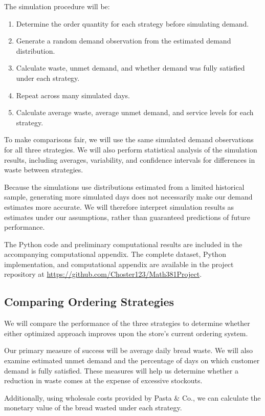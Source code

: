 \documentclass[11pt]{article}
\begin{document}
The simulation procedure will be:
\begin{enumerate}
\item Determine the order quantity for each strategy before simulating demand.
\item Generate a random demand observation from the estimated demand distribution.
\item Calculate waste, unmet demand, and whether demand was fully satisfied under each strategy.
\item Repeat across many simulated days.
\item Calculate average waste, average unmet demand, and service levels for each strategy.
\end{enumerate}

To make comparisons fair, we will use the same simulated demand observations for all three strategies. We will also perform statistical analysis of the simulation results, including averages, variability, and confidence intervals for differences in waste between strategies.

Because the simulations use distributions estimated from a limited historical sample, generating more simulated days does not necessarily make our demand estimates more accurate. We will therefore interpret simulation results as estimates under our assumptions, rather than guaranteed predictions of future performance.

The Python code and preliminary computational results are included in the accompanying computational appendix. The complete dataset, Python implementation, and computational appendix are available in the project repository at \url{https://github.com/Choster123/Math381Project}.

\subsection{Comparing Ordering Strategies}

We will compare the performance of the three strategies to determine whether either optimized approach improves upon the store's current ordering system.

Our primary measure of success will be average daily bread waste. We will also examine estimated unmet demand and the percentage of days on which customer demand is fully satisfied. These measures will help us determine whether a reduction in waste comes at the expense of excessive stockouts.

Additionally, using wholesale costs provided by Pasta \& Co., we can calculate the monetary value of the bread wasted under each strategy.
\end{document}
